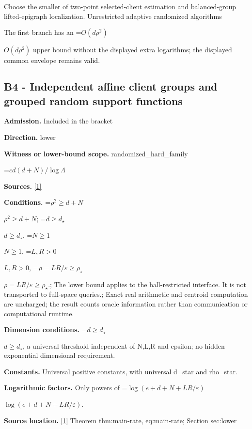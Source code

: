 \documentclass[10pt,a4paper]{article}
\newcommand{\AtlasMath}[1]{\par\begingroup\centering\setbox0=\hbox{$\displaystyle #1$}\ifdim\wd0>1.4\linewidth\typeout{ATLAS WIDE FORMULA: \the\wd0}\fi\ifdim\wd0>\linewidth\resizebox{\linewidth}{!}{\box0}\else\box0\fi\par\endgroup}
\newcommand{\AtlasInlineMath}[1]{\begingroup\setbox0=\hbox{$#1$}\ifdim\wd0>.4\linewidth\endgroup\AtlasMath{#1}\else\endgroup$#1$\fi}
\begin{document}
Choose the smaller of two-point selected-client estimation and balanced-group lifted-epigraph localization. Unrestricted adaptive randomized algorithms



The first branch has an \AtlasInlineMath{O(d\rho^2)} upper bound without the displayed extra logarithms; the displayed common envelope remains valid.



\subsection{B4 - Independent affine client groups and grouped random support functions}


\textbf{Admission.} Included in the bracket



\textbf{Direction.} lower



\textbf{Witness or lower-bound scope.} randomized\_hard\_family



\AtlasMath{cd(d+N)/\log\Lambda}


\textbf{Sources.} \href{https://github.com/WU-Wendao/Colombo/blob/main/colombo_sensorium/Complexity_altas/data/sources/colombo/U05/manuscript.pdf}{[1]}



\textbf{Conditions.} \AtlasInlineMath{\rho^2\ge d+N}; \AtlasInlineMath{d\ge d_\star}, \AtlasInlineMath{N\ge1}, \AtlasInlineMath{L,R>0}, \AtlasInlineMath{\rho=LR/\varepsilon\ge\rho_\star}.; The lower bound applies to the ball-restricted interface. It is not transported to full-space queries.; Exact real arithmetic and centroid computation are uncharged; the result counts oracle information rather than communication or computational runtime.



\textbf{Dimension conditions.} \AtlasInlineMath{d\ge d_\star}, a universal threshold independent of N,L,R and epsilon; no hidden exponential dimensional requirement.



\textbf{Constants.} Universal positive constants, with universal d\_star and rho\_star.



\textbf{Logarithmic factors.} Only powers of \AtlasInlineMath{\log(e+d+N+LR/\varepsilon)}.



\textbf{Source location.} \href{https://github.com/WU-Wendao/Colombo/blob/main/colombo_sensorium/Complexity_altas/data/sources/colombo/U05/manuscript.pdf}{[1]} Theorem thm:main-rate, eq:main-rate; Section sec:lower
\end{document}

